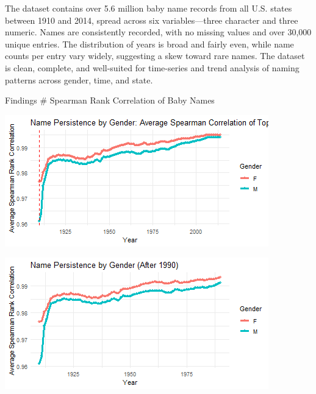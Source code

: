 \documentclass[11pt,preprint]{elsarticle}
\let\origfigure\figure
\let\endorigfigure\endfigure
\renewenvironment{figure}[1][2] {
    \expandafter\origfigure\expandafter[H]
} {
    \endorigfigure
}
\numberwithin{equation}{section}
\numberwithin{figure}{section}
\numberwithin{table}{section}
\begin{document}
The dataset contains over 5.6 million baby name records from all U.S.
states between 1910 and 2014, spread across six variables---three
character and three numeric. Names are consistently recorded, with no
missing values and over 30,000 unique entries. The distribution of years
is broad and fairly even, while name counts per entry vary widely,
suggesting a skew toward rare names. The dataset is clean, complete, and
well-suited for time-series and trend analysis of naming patterns across
gender, time, and state.

\newpage

Findings \# Spearman Rank Correlation of Baby Names

\begin{figure}[H]

{\centering \includegraphics{23034103_Q1USbabynames_files/figure-latex/Figure1-1}

}

\caption{Caption Here \label{Figure1}}\label{fig:Figure1-1}
\end{figure}
\begin{figure}[H]

{\centering \includegraphics{23034103_Q1USbabynames_files/figure-latex/Figure1-2}

}

\caption{Caption Here \label{Figure1}}\label{fig:Figure1-2}
\end{figure}
\end{document}
